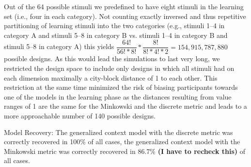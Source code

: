 Out of the 64 possible stimuli we predefined to have eight stimuli in the learning set (i.e., four in each category). Not counting exactly inversed and thus repetitive partitioning of learning stimuli into the two categories (e.g., stimuli 1--4 in category A and stimuli 5--8 in category B vs. stimuli 1--4 in category B and stimuli 5--8 in category A) this yields $\dfrac{64!}{56!*8!}*\dfrac{8!}{8!*4!*2} = 154,915,787,880$ possible designs. As this would lead the simulations to last very long, we restricted the design space to include only designs in which all stimuli had on each dimension maximally a city-block distance of 1 to each other. This restriction at the same time minimized the risk of biasing participants towards one of the models in the learning phase as the distances resulting from value ranges of 1 are the same for the Minkowski and the discrete metric and leads to a more approachable number of 140 possible designs.

Model Recovery:
The generalized context model with the discrete metric was correctly recovered in 100\% of all cases, the generalized context model with the Minkowski metric was correctly recovered in 86.7\% \textbf{(I have to recheck this)} of all cases. 

